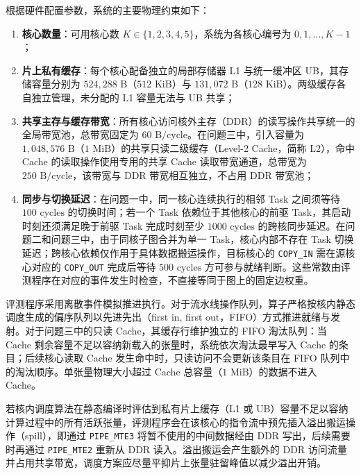 \documentclass[anonymous,withtoc]{gmcm2026}
\providecommand{\tightlist}{\setlength{\itemsep}{0pt}\setlength{\parskip}{0pt}}
\begin{document}
根据硬件配置参数，系统的主要物理约束如下：

\begin{enumerate}
\def\labelenumi{\arabic{enumi}.}
\tightlist
\item
  \textbf{核心数量}：可用核心数 \(K \in \{1, 2, 3, 4, 5\}\)，系统为各核心编号为 \(0, 1, \dots, K-1\)；
\item
  \textbf{片上私有缓存}：每个核心配备独立的局部存储器 L1 与统一缓冲区 UB，其存储容量分别为 \(524{,}288\text{ B}\)（\(512\text{ KiB}\)）与 \(131{,}072\text{ B}\)（\(128\text{ KiB}\)）。两级缓存各自独立管理，未分配的 L1 容量无法与 UB 共享；
\item
  \textbf{共享主存与缓存带宽}：所有核心访问核外主存（DDR）的读写操作共享统一的全局带宽池，总带宽固定为 \(60\text{ B/cycle}\)。在问题三中，引入容量为 \(1{,}048{,}576\text{ B}\)（\(1\text{ MiB}\)）的共享只读二级缓存（Level-2 Cache，简称 L2），命中 Cache 的读取操作使用专用的共享 Cache 读取带宽通道，总带宽为 \(250\text{ B/cycle}\)，该带宽与 DDR 带宽相互独立，不占用 DDR 带宽池；
\item
  \textbf{同步与切换延迟}：在问题一中，同一核心连续执行的相邻 Task 之间须等待 \(100\text{ cycles}\) 的切换时间；若一个 Task 依赖位于其他核心的前驱 Task，其启动时刻还须满足晚于前驱 Task 完成时刻至少 \(1000\text{ cycles}\) 的跨核同步延迟。在问题二和问题三中，由于同核子图合并为单一 Task，核心内部不存在 Task 切换延迟；跨核心依赖仅作用于具体数据搬运操作，目标核心的 \texttt{COPY\_IN} 需在源核心对应的 \texttt{COPY\_OUT} 完成后等待 \(500\text{ cycles}\) 方可参与就绪判断。这些常数由评测程序在对应的事件发生时检查，不直接等同于图上的固定边权重。
\end{enumerate}

评测程序采用离散事件模拟推进执行。对于流水线操作队列，算子严格按核内静态调度生成的偏序队列以先进先出（first in, first out，FIFO）方式推进就绪与发射。对于问题三中的只读 Cache，其缓存行维护独立的 FIFO 淘汰队列：当 Cache 剩余容量不足以容纳新载入的张量时，系统依次淘汰最早写入 Cache 的条目；后续核心读取 Cache 发生命中时，只读访问不会更新该条目在 FIFO 队列中的淘汰顺序。单张量物理大小超过 Cache 总容量（\(1\text{ MiB}\)）的数据不进入 Cache。

若核内调度算法在静态编译时评估到私有片上缓存（L1 或 UB）容量不足以容纳计算过程中的所有活跃张量，评测程序会在该核心的指令流中预先插入溢出搬运操作（spill），即通过 \texttt{PIPE\_MTE3} 将暂不使用的中间数据经由 DDR 写出，后续需要时再通过 \texttt{PIPE\_MTE2} 重新从 DDR 读入。溢出搬运会产生额外的 DDR 访问流量并占用共享带宽，调度方案应尽量平抑片上张量驻留峰值以减少溢出开销。
\end{document}
